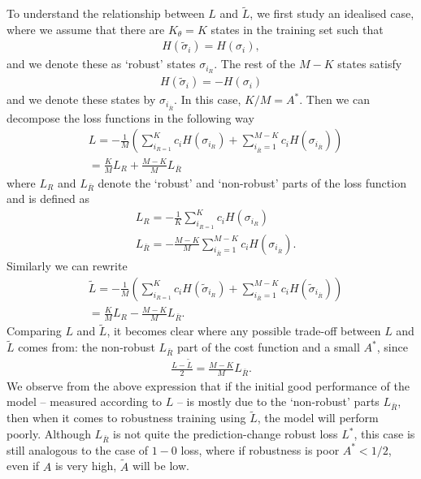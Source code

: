 \documentclass[onecolumn,prx, superscriptaddress,longbibliography,margin=1mm 11pt]{revtex4-2}
\begin{document}
To understand the relationship between $L$ and $\tilde{L}$, we first study an idealised case, where we assume that there are $K_{\theta}=K$ states in the training set such that 
\begin{align} \label{eq:ideal1}
    H(\tilde{\sigma}_i)=H(\sigma_i),
\end{align}
and we denote these as `robust' states $\sigma_{i_R}$. The rest of the $M-K$ states satisfy
\begin{align} \label{eq:ideal2}
    H(\tilde{\sigma}_i)=-H(\sigma_i)
\end{align}
and we denote these states by $\sigma_{i_{\bar{R}}}$. In this case, $K/M=A^*$. Then we can decompose the loss functions in the following way
\begin{align}
    & L=-\frac{1}{M}\left(\sum_{i_{R=1}}^K c_i H(\sigma_{i_R})+\sum_{i_{\bar{R}}=1}^{M-K}c_i H(\sigma_{i_{\bar{R}}})\right) \nonumber \\
    &=\frac{K}{M}L_R+\frac{M-K}{M}L_{\bar{R}}
\end{align}
where $L_R$ and $L_{\bar{R}}$ denote the `robust' and `non-robust' parts of the loss function and is defined as
\begin{align}
    & L_R=-\frac{1}{K}\sum_{i_{R=1}}^K c_i H(\sigma_{i_R}) \\
    & L_{\bar{R}}=-\frac{M-K}{M}\sum_{i_{\bar{R}}=1}^{M-K}c_i H(\sigma_{i_{\bar{R}}}).
\end{align}
Similarly we can rewrite
\begin{align}
   & \tilde{L}=-\frac{1}{M}\left(\sum_{i_{R=1}}^K c_i H(\tilde{\sigma}_{i_R})+\sum_{i_{\bar{R}}=1}^{M-K}c_i H(\tilde{\sigma}_{i_{\bar{R}}})\right) \nonumber \\
   & =\frac{K}{M}L_R-\frac{M-K}{M}L_{\bar{R}}.
\end{align}
Comparing $L$ and $\tilde{L}$, it becomes clear where any possible trade-off between $L$ and $\tilde{L}$ comes from: the non-robust $L_{\bar{R}}$ part of the cost function and a small $A^*$, since
\begin{align}
    \frac{L-\tilde{L}}{2}=\frac{M-K}{M}L_{\bar{R}}.
\end{align}
We observe from the above expression that if the initial good performance of the model -- measured according to $L$ -- is mostly due to the `non-robust' parts $L_{\bar{R}}$, then when it comes to robustness training using $\tilde{L}$, the model will perform poorly. Although $L_{\bar{R}}$ is not quite the prediction-change robust loss $L^*$, this case is still analogous to the case of $1-0$ loss, where if robustness is poor $A^*<1/2$, even if $A$ is very high, $\tilde{A}$ will be low. \\
\end{document}
